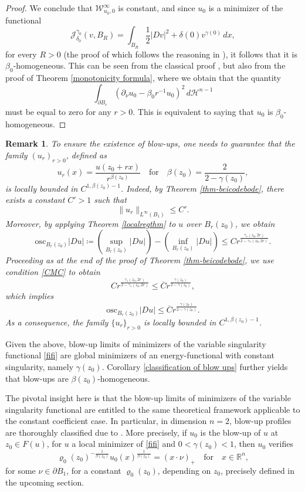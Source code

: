 \documentclass[reqno,11pt]{amsart}
\newtheorem{remark}{Remark}[section]
\newcommand{\1}{\mathds{1}}
\numberwithin{equation}{section}
\begin{document}
\begin{proof}
We conclude that $\mathcal{W}^\infty_{u_0,0}$ is constant, and since $u_0$ is a minimizer of the functional 
\begin{equation}\label{AP constant gamma}
    \mathcal{J}_{\delta_0}^{\gamma_0}(v,B_R) = \int_{B_R} \frac{1}{2}|Dv|^2 + \delta(0)v^{\gamma(0)} \, dx,
\end{equation}
for every $R>0$ (the proof of which follows the reasoning in \cite[Lemma 2.3 and Remark 1]{PT24}), it follows that it is $\beta_0$-homogeneous. This can be seen from the classical proof \cite[Lemma 7.1]{AP}, but also from the proof of Theorem \ref{monotonicity formula}, where we obtain that the quantity
$$
	\int_{\partial B_r}(\partial_\nu u_0 - \beta_0 r^{-1}u_0)^2\,d\mathcal{H}^{n-1}
$$
must be equal to zero for any $r>0$. This is equivalent to saying that $u_0$ is $\beta_0$-homogeneous.
\end{proof}

\begin{remark}\label{remark de convergencia}
To ensure the existence of blow-ups, one needs to guarantee that the family $(u_r)_{r>0}$, defined as
$$
    u_r(x) = \frac{u(z_0 + rx)}{r^{\beta(z_0)}} \quad \text{for} \quad \beta(z_0) = \frac{2}{2-\gamma(z_0)},
$$
is locally bounded in $C^{1,\beta(z_0)-1}$. Indeed, by Theorem \ref{thm-beicodebode}, there exists a constant $C'>1$ such that
$$
    \|u_r\|_{L^\infty(B_1)} \leq C'.
$$
Moreover, by applying Theorem \ref{localregthm} to $u$ over $B_{r}(z_0)$, we obtain
$${\mathrm{osc}}_{B_r(z_0)} |Du| \coloneqq \left(\sup_{B_r(z_0)} |Du|\right) - \left(\inf_{B_r(z_0)} |Du|\right) \leq C r^{\frac{\gamma_\ast(z_0,2r)}{2-\gamma_\ast(z_0,2r)}}.
$$
Proceeding as at the end of the proof of Theorem \ref{thm-beicodebode}, we use condition \eqref{CMC} to obtain
$$
    Cr^{\frac{\gamma_\ast(z_0,2r)}{2-\gamma_\ast(z_0,2r)}} \leq \overline{C} r^{\frac{\gamma(z_0)}{2-\gamma(z_0)}},
$$
which implies
$$
    {\mathrm{osc}}_{B_r(z_0)}|Du| \leq \overline{C} r^{\frac{\gamma(z_0)}{2-\gamma(z_0)}}.
$$
As a consequence, the family $\{u_r\}_{r>0}$ is locally bounded in $C^{1,\beta(z_0)-1}$.
\end{remark}

Given the above, blow-up limits of minimizers of the variable singularity functional \eqref{fifi} are global minimizers of an energy-functional with constant singularity, namely $\gamma(z_0)$. Corollary \ref{classification of blow ups} further yields that blow-ups are $\beta(z_0)$-homogeneous. 

The pivotal insight here is that the blow-up limits of minimizers of the variable singularity functional are entitled to the same theoretical framework applicable to the constant coefficient case. In particular, in dimension $n=2$, blow-up profiles are thoroughly classified due to \cite[Theorem 8.2]{AP}. More precisely, if $u_0$ is the blow-up of $u$ at $z_0 \in F(u)$, for $u$ a local minimizer of \eqref{fifi} and $0 < \gamma(z_0) < 1$, then $u_0$ verifies
$$
    \varrho_0(z_0)^{-\frac{1}{\beta(z_0)}}u_0(x)^{\frac{1}{\beta(z_0)}} =  (x \cdot \nu)_+ \quad \text{for} \quad x \in \mathbb{R}^n, 
$$
for some $\nu \in \partial B_1$, for a constant $\varrho_0(z_0)$, depending on $z_0$, precisely defined in the upcoming section.
\end{document}

